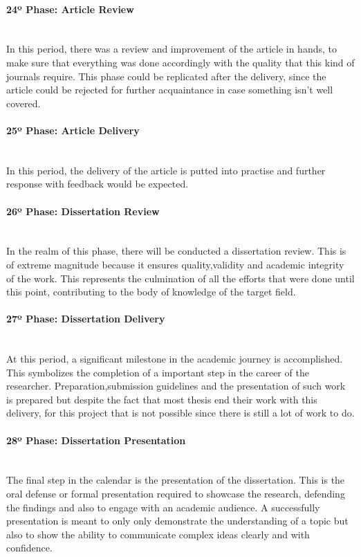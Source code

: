 \paragraph{24º Phase: Article Review}\mbox{}\\
In this period, there was a review and improvement of the article in hands, to make sure that everything was done accordingly with the quality that this kind of journals require. This phase could be replicated after the delivery, since the article could be rejected for further acquaintance in case something isn't well covered.

\paragraph{25º Phase: Article Delivery}\mbox{}\\
In this period, the delivery of the article is putted into practise and further response with feedback would be expected.

\paragraph{26º Phase: Dissertation Review}\mbox{}\\
In the realm of this phase, there will be conducted a dissertation review. This is of extreme magnitude because it ensures quality,validity and academic integrity of the work. This represents the culmination of all the efforts that were done until this point, contributing to the body of knowledge of the target field.

\paragraph{27º Phase: Dissertation Delivery}\mbox{}\\
At this period, a significant milestone in the academic journey is accomplished. This symbolizes the completion of a important step in the career of the researcher. Preparation,submission guidelines and the presentation of such work is prepared but despite the fact that most thesis end their work with this delivery, for this project that is not possible since there is still a lot of work to do.

\paragraph{28º Phase: Dissertation Presentation}\mbox{}\\
The final step in the calendar is the presentation of the dissertation. This is the oral defense or formal presentation required to showcase the research, defending the findings and also to engage with an academic audience. A successfully presentation is meant to only only demonstrate the understanding of a topic but also to show the ability to communicate complex ideas clearly and with confidence.


